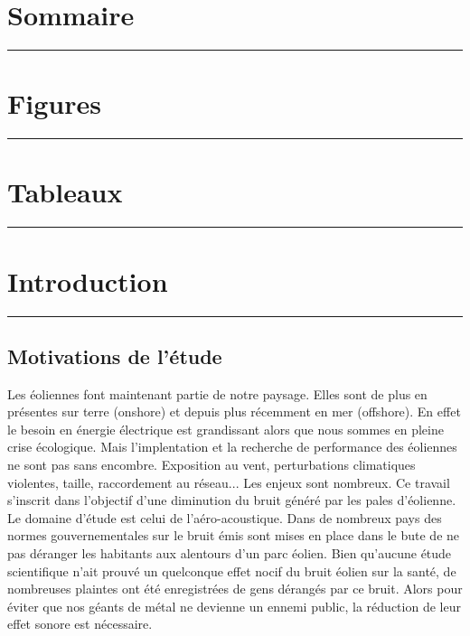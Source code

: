 \documentclass[12pt]{article}   %
\theoremstyle{plain}
\theoremstyle{remark}
\begin{document}
	\newpage
	
	\section*{Sommaire}
	
	\noindent\rule{\textwidth}{0.3pt}
	\vspace{0.5cm}
	

\clearpage
\section*{\Large Figures}
\noindent\rule{\textwidth}{0.3pt}
\vspace{0.5cm}

\listoffigures

\clearpage
\section*{\Large Tableaux}
\noindent\rule{\textwidth}{0.3pt}
\vspace{0.5cm}

\listoftables
	
\clearpage
	
	
	\section{Introduction}
	\noindent\rule{\linewidth}{2pt}
	\vspace{0.1cm}
	\subsection{Motivations de l'étude}
	
	Les éoliennes font maintenant partie de notre paysage. Elles sont de plus en présentes sur terre (onshore) et depuis plus récemment en mer (offshore). En effet le besoin en énergie électrique est grandissant alors que nous sommes en pleine crise écologique. Mais l'implentation et la recherche de performance des éoliennes ne sont pas sans encombre. Exposition au vent, perturbations climatiques violentes, taille, raccordement au réseau... Les enjeux sont nombreux. Ce travail s'inscrit dans l'objectif d'une diminution du bruit généré par les pales d'éolienne. Le domaine d'étude est celui de l'aéro-acoustique. Dans de nombreux pays des normes gouvernementales sur le bruit émis \cite{impactacoustique2023} sont mises en place dans le bute de ne pas déranger les habitants aux alentours d'un parc éolien. Bien qu'aucune étude scientifique n'ait prouvé un quelconque effet nocif du bruit éolien sur la santé, de nombreuses plaintes ont été enregistrées de gens dérangés par ce bruit. Alors pour éviter que nos géants de métal ne devienne un ennemi public, la réduction de leur effet sonore est nécessaire. \\
	
\end{document}
